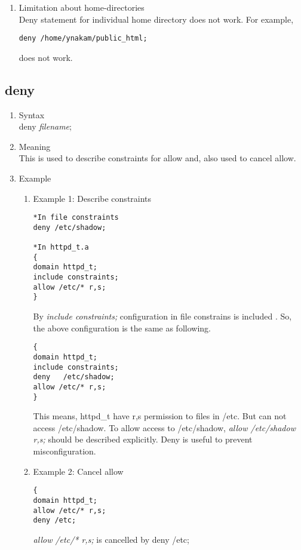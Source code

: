 \documentclass{article}
\begin{document}
\begin{enumerate}
	\begin{verbatim}
Example:
        {
	  domain httpd_t;
          program /usr/sbin/httpd;
          allow /var/www/cgi-bin/test.cgi r,s,dx;
        }
        {
	  domain cgi_t;
          program /var/www/cgi-bin/test.cgi;
          allow ............
        }
	\end{verbatim}
	In this case, httpd\_t domain have dx permission to
	test.cgi. Domain is defined below. So, test.cgi runs as
	different domain.           
  \item Limitation about home-directories\\
	Deny statement for individual home directory does not work.
	For example,
	\begin{verbatim}
deny /home/ynakam/public_html;
	\end{verbatim}
does not work.

 \end{enumerate}

\subsection{deny}
\begin{enumerate}
 \item Syntax\\
 deny {\it filename};
 \item Meaning\\
This is used to describe constraints for allow and, also used to cancel allow.
 \item Example
\begin{enumerate}
 \item Example 1: Describe constraints\\
   \begin{verbatim}
*In file constraints
deny /etc/shadow;

*In httpd_t.a
{
domain httpd_t;
include constraints;
allow /etc/* r,s; 
}
   \end{verbatim}
By {\it include constraints;} configuration in file constrains is
       included .
So, the above configuration is the same as following.
       \begin{verbatim}
{
domain httpd_t;
include constraints;
deny   /etc/shadow;
allow /etc/* r,s;
}
       \end{verbatim}
This means, httpd\_t have r,s permission to files in /etc. But can not
       access /etc/shadow.
To allow access to /etc/shadow, 
{\it allow /etc/shadow r,s;} should be described explicitly.
Deny is useful to prevent misconfiguration.

 \item Example 2: Cancel allow\\
\begin{verbatim}
{
domain httpd_t;
allow /etc/* r,s;
deny /etc;
\end{verbatim}
{\it allow /etc/* r,s;} is cancelled by deny /etc;

\end{enumerate}
\end{enumerate}
\end{document}
